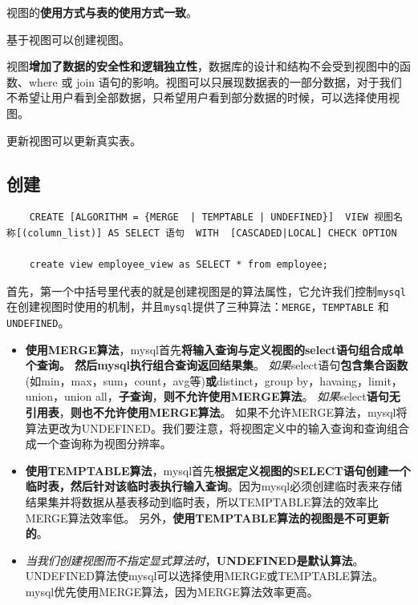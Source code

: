 \documentclass[UTF8,a4paper,12pt]{ctexbook}
\begin{document}
		视图的\textbf{使用方式与表的使用方式一致}。
		
		基于视图可以创建视图。
		
		视图\textbf{增加了数据的安全性和逻辑独立性}，数据库的设计和结构不会受到视图中的函数、where 或 join 语句的影响。视图可以只展现数据表的一部分数据，对于我们不希望让用户看到全部数据，只希望用户看到部分数据的时候，可以选择使用视图。
		
		更新视图可以更新真实表。
		
		\subsection{创建}
			\begin{lstlisting}
	CREATE [ALGORITHM = {MERGE  | TEMPTABLE | UNDEFINED}]  VIEW 视图名称[(column_list)] AS SELECT 语句  WITH  [CASCADED|LOCAL] CHECK OPTION
	
	create view employee_view as SELECT * from employee;			
			\end{lstlisting}
			首先，第一个中括号里代表的就是创建视图是的算法属性，它允许我们控制\verb|mysql|在创建视图时使用的机制，并且\verb|mysql|提供了三种算法：\verb|MERGE|，\verb|TEMPTABLE| 和 \verb|UNDEFINED|。	
			
			
			\begin{itemize}
				\item \textbf{使用MERGE算法}，mysql首先\textbf{将输入查询与定义视图的select语句组合成单个查询。 然后mysql执行组合查询返回结果集}。 \textit{如果}select语句\textbf{包含集合函数}(如min，max，sum，count，avg等)\textbf{或}distinct，group by，havaing，limit，union，union all，\textbf{子查询}，\textbf{则不允许使用MERGE算法}。 \textit{如果}select\textbf{语句无引用表}，\textbf{则也不允许使用MERGE算法}。 如果不允许MERGE算法，mysql将算法更改为UNDEFINED。我们要注意，将视图定义中的输入查询和查询组合成一个查询称为视图分辨率。
				
				\item \textbf{使用TEMPTABLE算法}，mysql首先\textbf{根据定义视图的SELECT语句创建一个临时表，然后针对该临时表执行输入查询}。因为mysql必须创建临时表来存储结果集并将数据从基表移动到临时表，所以TEMPTABLE算法的效率比MERGE算法效率低。 另外，\textbf{使用TEMPTABLE算法的视图是不可更新的}。
				
				\item \textit{当我们创建视图而不指定显式算法时}，\textbf{UNDEFINED是默认算法}。 UNDEFINED算法使mysql可以选择使用MERGE或TEMPTABLE算法。mysql优先使用MERGE算法，因为MERGE算法效率更高。
			\end{itemize}
			
\end{document}
